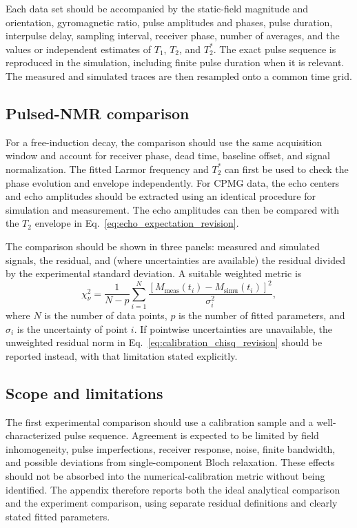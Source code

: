 Each data set should be accompanied by the static-field magnitude and
orientation, gyromagnetic ratio, pulse amplitudes and phases, pulse duration,
interpulse delay, sampling interval, receiver phase, number of averages, and
the values or independent estimates of $T_1$, $T_2$, and $T_2^*$.  The exact
pulse sequence is reproduced in the simulation, including finite pulse
duration when it is relevant.  The measured and simulated traces are then
resampled onto a common time grid.

\subsection{Pulsed-NMR comparison}

For a free-induction decay, the comparison should use the same acquisition
window and account for receiver phase, dead time, baseline offset, and signal
normalization.  The fitted Larmor frequency and $T_2^*$ can first be used to
check the phase evolution and envelope independently.  For CPMG data, the
echo centers and echo amplitudes should be extracted using an identical
procedure for simulation and measurement.  The echo amplitudes can then be
compared with the $T_2$ envelope in Eq.~\eqref{eq:echo_expectation_revision}.

The comparison should be shown in three panels: measured and simulated
signals, the residual, and (where uncertainties are available) the residual
divided by the experimental standard deviation.  A suitable weighted metric
is
\begin{equation}
    \chi^2_{\nu} = \frac{1}{N-p}
    \sum_{i=1}^{N}
    \frac{\left[M_{\mathrm{meas}}(t_i)-M_{\mathrm{simu}}(t_i)\right]^2}
    {\sigma_i^2},
    \label{eq:experimental_reduced_chisq_revision}
\end{equation}
where $N$ is the number of data points, $p$ is the number of fitted
parameters, and $\sigma_i$ is the uncertainty of point $i$.  If pointwise
uncertainties are unavailable, the unweighted residual norm in
Eq.~\eqref{eq:calibration_chisq_revision} should be reported instead, with
that limitation stated explicitly.

\subsection{Scope and limitations}

The first experimental comparison should use a calibration sample and a
well-characterized pulse sequence.  Agreement is expected to be limited by
field inhomogeneity, pulse imperfections, receiver response, noise, finite
bandwidth, and possible deviations from single-component Bloch relaxation.
These effects should not be absorbed into the numerical-calibration metric
without being identified.  The appendix therefore reports both the ideal
analytical comparison and the experiment comparison, using separate residual
definitions and clearly stated fitted parameters.

